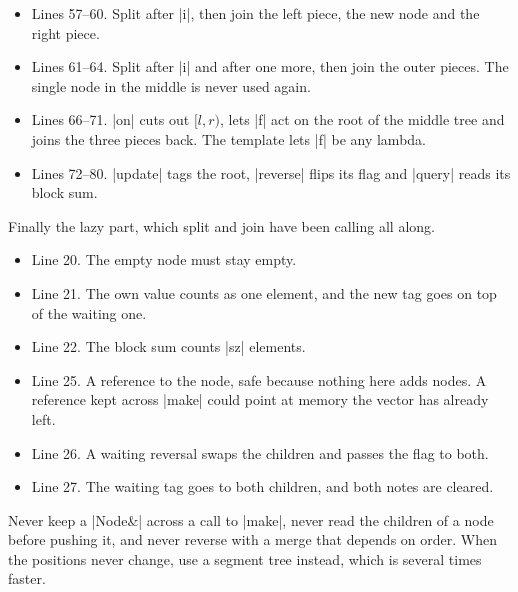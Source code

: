 \begin{notes}
\begin{itemize}
\item Lines 57--60. Split after \code|i|, then join the left piece, the new node and the right piece.
\item Lines 61--64. Split after \code|i| and after one more, then join the outer pieces. The single node in the middle is never used again.
\item Lines 66--71. \code|on| cuts out \([l, r)\), lets \code|f| act on the root of the middle tree and joins the three pieces back. The template lets \code|f| be any lambda.
\item Lines 72--80. \code|update| tags the root, \code|reverse| flips its flag and \code|query| reads its block sum.
\end{itemize}
\end{notes}

Finally the lazy part, which split and join have been calling all along.


\begin{notes}
\begin{itemize}
\item Line 20. The empty node must stay empty.
\item Line 21. The own value counts as one element, and the new tag goes on top of the waiting one.
\item Line 22. The block sum counts \code|sz| elements.
\item Line 25. A reference to the node, safe because nothing here adds nodes. A reference kept across \code|make| could point at memory the vector has already left.
\item Line 26. A waiting reversal swaps the children and passes the flag to both.
\item Line 27. The waiting tag goes to both children, and both notes are cleared.
\end{itemize}
\end{notes}

\begin{pitfall}
Never keep a \code|Node&| across a call to \code|make|, never read the children of a node before pushing it, and never reverse with a merge that depends on order. When the positions never change, use a segment tree instead, which is several times faster.
\end{pitfall}

